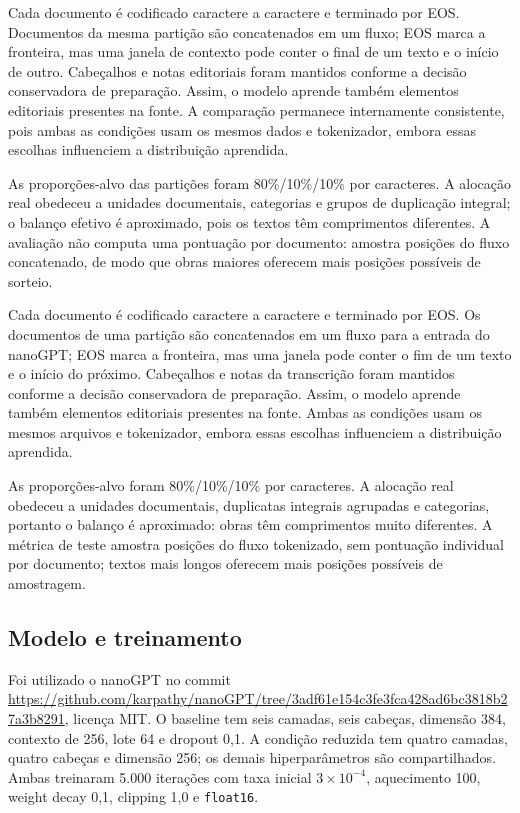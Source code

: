 \documentclass[conference]{IEEEtran}
\begin{document}
Cada documento é codificado caractere a caractere e terminado por EOS. Documentos da mesma partição são concatenados em um fluxo; EOS marca a fronteira, mas uma janela de contexto pode conter o final de um texto e o início de outro. Cabeçalhos e notas editoriais foram mantidos conforme a decisão conservadora de preparação. Assim, o modelo aprende também elementos editoriais presentes na fonte. A comparação permanece internamente consistente, pois ambas as condições usam os mesmos dados e tokenizador, embora essas escolhas influenciem a distribuição aprendida.

As proporções-alvo das partições foram 80\%/10\%/10\% por caracteres. A alocação real obedeceu a unidades documentais, categorias e grupos de duplicação integral; o balanço efetivo é aproximado, pois os textos têm comprimentos diferentes. A avaliação não computa uma pontuação por documento: amostra posições do fluxo concatenado, de modo que obras maiores oferecem mais posições possíveis de sorteio.

Cada documento é codificado caractere a caractere e terminado por EOS. Os documentos de uma partição são concatenados em um fluxo para a entrada do nanoGPT; EOS marca a fronteira, mas uma janela pode conter o fim de um texto e o início do próximo. Cabeçalhos e notas da transcrição foram mantidos conforme a decisão conservadora de preparação. Assim, o modelo aprende também elementos editoriais presentes na fonte. Ambas as condições usam os mesmos arquivos e tokenizador, embora essas escolhas influenciem a distribuição aprendida.

As proporções-alvo foram 80\%/10\%/10\% por caracteres. A alocação real obedeceu a unidades documentais, duplicatas integrais agrupadas e categorias, portanto o balanço é aproximado: obras têm comprimentos muito diferentes. A métrica de teste amostra posições do fluxo tokenizado, sem pontuação individual por documento; textos mais longos oferecem mais posições possíveis de amostragem.

\subsection{Modelo e treinamento}

Foi utilizado o nanoGPT no commit \url{https://github.com/karpathy/nanoGPT/tree/3adf61e154c3fe3fca428ad6bc3818b27a3b8291}, licença MIT. O baseline tem seis camadas, seis cabeças, dimensão 384, contexto de 256, lote 64 e dropout 0,1. A condição reduzida tem quatro camadas, quatro cabeças e dimensão 256; os demais hiperparâmetros são compartilhados. Ambas treinaram 5.000 iterações com taxa inicial $3\times10^{-4}$, aquecimento 100, weight decay 0,1, clipping 1,0 e \texttt{float16}.
\end{document}
